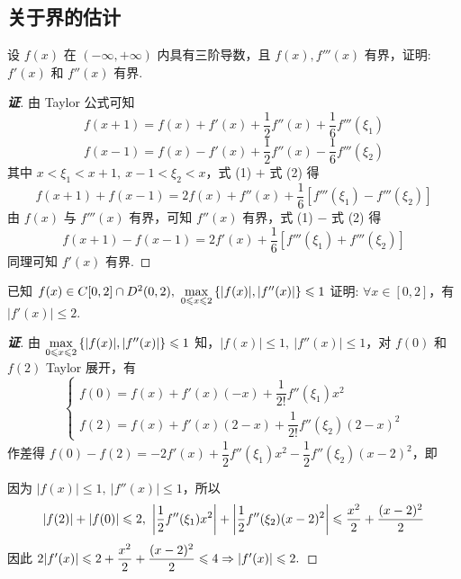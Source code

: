 \subsection{关于界的估计}

\begin{example}
    设 $f(x)$ 在 $(-\infty,+\infty)$ 内具有三阶导数，且 $f(x),f'''(x)$ 有界，证明: $f'(x)$ 和 $f''(x)$ 有界.
\end{example}
\begin{proof}[{\songti \textbf{证}}]
    由 Taylor 公式可知
    \begin{equation}
        f(x+1 ) =f(x)+f'(x) +\dfrac{1}{2}f''(x) +\dfrac{1}{6}f'''(\xi_1 ) \tag{1}
    \end{equation}
    \begin{equation}
        f(x-1 ) =f(x) -f'(x) +\dfrac{1}{2}f''(x) -\dfrac{1}{6}f'''(\xi_2 ) \tag{2}
    \end{equation}
    其中 $x <\xi _{1} <x+1,~x-1 <\xi _{2} <x$，式 (1) $+$ 式 (2) 得
    $$f(x+1 ) +f(x-1 ) =2f(x) +f''(x) +\dfrac{1}{6}\left[ f'''(\xi_1 ) -f'''(\xi_2 ) \right] $$
    由 $f(x)$ 与 $f'''(x)$ 有界，可知 $f''(x)$ 有界，式 (1) $-$ 式 (2) 得
    $$f(x+1 ) -f(x-1 ) =2f'(x) +\dfrac{1}{6}\left[ f'''(\xi_1 ) +f'''(\xi_2 ) \right] $$
    同理可知 $f'(x)$ 有界.
\end{proof}

\begin{example}
    已知 $f(x)\in C[0,2]\cap D^2(0,2),~\max\limits_{0\leqslant x\leqslant 2}\qty{|f(x)|,|f''(x)|}\leqslant 1$ 证明: $\forall x\in[0,2]$，有 $|f'(x)|\leqslant 2.$
\end{example}
\begin{proof}[{\songti \textbf{证}}]
    由 $\max\limits_{0\leqslant x\leqslant 2}\qty{|f(x)|,|f''(x)|}\leqslant 1$ 知，$|f(x)|\leqslant 1,~|f''(x)|\leqslant 1$，对 $f(0)$ 和 $f(2)$ Taylor 展开，有
    $$\begin{cases}
        f(0)=f(x)+f'(x)(-x)+\dfrac{1}{2!}f''(\xi_1)x^2\\[6pt]
        f(2)=f(x)+f'(x)(2-x)+\dfrac{1}{2!}f''(\xi_2)(2-x)^2
    \end{cases}$$
    作差得 $f(0)-f(2)=-2f'(x)+\dfrac{1}{2}f''(\xi_1)x^2-\dfrac{1}{2}f''(\xi_2)(x-2)^2$，即 
    因为 $|f(x)|\leqslant 1,~|f''(x)|\leqslant 1$，所以 $$|f(2)|+|f(0)|\leqslant 2,~\qty|\dfrac{1}{2}f''(\xi_1)x^2|+\qty|\dfrac{1}{2}f''(\xi_2)(x-2)^2|\leqslant \dfrac{x^2}{2}+\dfrac{(x-2)^2}{2}$$
    因此 $2\qty|f'(x)|\leqslant 2+\dfrac{x^2}{2}+\dfrac{(x-2)^2}{2}\leqslant 4\Rightarrow |f'(x)|\leqslant 2.$
\end{proof}

